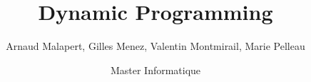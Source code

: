 \documentclass{beamer}
\title{Dynamic Programming}
\author[]{Arnaud Malapert, Gilles Menez, Valentin Montmirail, Marie Pelleau}
\date[2018 - 2019]{Master Informatique}
\begin{document}
\frame{
  \titlepage
}
\end{document}
